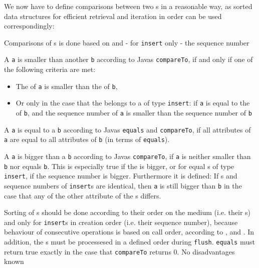 We now have to define comparisons between two \MediumAction{}s in a reasonable way, as sorted data structures for efficient retrieval and iteration in order can be used correspondingly:

{%
Comparisons of \MediumAction{}s is done based on \IMediumReference{} and - for \texttt{insert} only - the sequence number
}
{%
A \MediumAction{} \texttt{a} is smaller than another \MediumAction{} \texttt{b} according to Javas \texttt{compareTo}, if and only if one of the following criteria are met:
\begin{itemize}
\item The \IMediumReference{} of \texttt{a} is smaller than the \IMediumReference{} of \texttt{b},
\item Or only in the case that the \IMediumReference{} belongs to a \MediumAction{} of type \texttt{insert}: if \texttt{a} is equal to the \IMediumReference{} of \texttt{b}, and the sequence number of \texttt{a} is smaller than the sequence number of \texttt{b}
\end{itemize}

A \MediumAction{} \texttt{a} is equal to a \MediumAction{} \texttt{b} according to Javas \texttt{equals} and \texttt{compareTo}, if all attributes of \texttt{a} are equal to all attributes of \texttt{b} (in terms of \texttt{equals}).

A \MediumAction{} \texttt{a} is bigger than a \MediumAction{} \texttt{b} according to Javas \texttt{compareTo}, if \texttt{a} is neither smaller than \texttt{b} nor equals \texttt{b}. This is especially true if the \IMediumReference{} is bigger, or for equal \IMediumReference{}s of type \texttt{insert}, if the sequence number is bigger. Furthermore it is defined: If \IMediumReference{}s and sequence numbers of \texttt{insert}s are identical, then \texttt{a} is still bigger than \texttt{b} in the case that any of the other attribute of the \MediumAction{}s differs.
}
{%
Sorting of \MediumAction{}s should be done according to their order on the medium (i.e. their \IMediumReference{}s) and only for \texttt{insert}s in creation order (i.e. their sequence number), because behaviour of consecutive operations is based on call order, according to ,  and . In addition, the \MediumAction{}s must be processesed in a defined order during \texttt{flush}. \texttt{equals} must return true exactly in the case that \texttt{compareTo} returns 0.
}
{%
No disadvantages known
}

